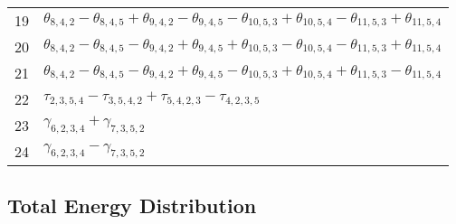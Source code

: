 \documentclass[10pt,oneside]{article}
\begin{document}
\begin{table}[h!]
\begin{tabular}{ll}
  19  & $\theta_{8,4,2} - \theta_{8,4,5} + \theta_{9,4,2} - \theta_{9,4,5} - \theta_{10,5,3} + \theta_{10,5,4} - \theta_{11,5,3} + \theta_{11,5,4}$ \\
  20  & $\theta_{8,4,2} - \theta_{8,4,5} - \theta_{9,4,2} + \theta_{9,4,5} + \theta_{10,5,3} - \theta_{10,5,4} - \theta_{11,5,3} + \theta_{11,5,4}$ \\
  21  & $\theta_{8,4,2} - \theta_{8,4,5} - \theta_{9,4,2} + \theta_{9,4,5} - \theta_{10,5,3} + \theta_{10,5,4} + \theta_{11,5,3} - \theta_{11,5,4}$ \\
  22  & $\tau_{2,3,5,4} - \tau_{3,5,4,2} + \tau_{5,4,2,3} - \tau_{4,2,3,5}$ \\
  23  & $\gamma_{6,2,3,4} + \gamma_{7,3,5,2}$ \\
  24  & $\gamma_{6,2,3,4} - \gamma_{7,3,5,2}$ \\
\bottomrule
\end{tabular}
\end{table}

\begin{table}
\subsection*{Total Energy Distribution}
\centering\end{table}

\clearpage

\subsection{}
\end{document}
